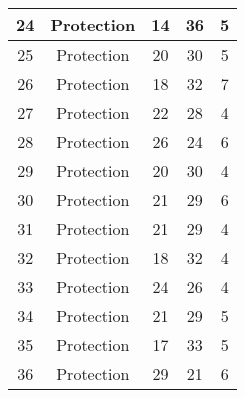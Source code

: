 \documentclass[results.tex]{subfiles}
\begin{document}
\begin{center}
\begin{tabular}{| c || c | c | c | c |}
            \hline
            24                      & Protection                   & 14                     & 36                      & 5                    \\
            \hline
            25                      & Protection                   & 20                     & 30                      & 5                    \\
            \hline
            26                      & Protection                   & 18                     & 32                      & 7                    \\
            \hline
            27                      & Protection                   & 22                     & 28                      & 4                    \\
            \hline
            28                      & Protection                   & 26                     & 24                      & 6                    \\
            \hline
            29                      & Protection                   & 20                     & 30                      & 4                    \\
            \hline
            30                      & Protection                   & 21                     & 29                      & 6                    \\
            \hline
            31                      & Protection                   & 21                     & 29                      & 4                    \\
            \hline
            32                      & Protection                   & 18                     & 32                      & 4                    \\
            \hline
            33                      & Protection                   & 24                     & 26                      & 4                    \\
            \hline
            34                      & Protection                   & 21                     & 29                      & 5                    \\
            \hline
            35                      & Protection                   & 17                     & 33                      & 5                    \\
            \hline
            36                      & Protection                   & 29                     & 21                      & 6                    \\

\end{tabular}
\end{center}
\end{document}
